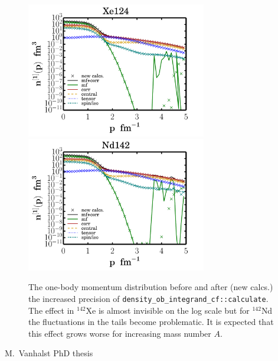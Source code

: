 \documentclass[10pt]{article}
\begin{document}
\begin{figure}
\centering
\includegraphics[width=0.7\textwidth]{figures/ob_Xe124_comparison.pdf}
\includegraphics[width=0.7\textwidth]{figures/ob_Nd142_comparison.pdf}
\caption{The one-body momentum distribution before and after (new calcs.) the increased precision of \texttt{density\_ob\_integrand\_cf::calculate}.
The effect in $^{142}$Xe is almost invisible on the log scale but for $^{142}$Nd the fluctuations in
the tails become problematic. It is expected that this effect grows worse for increasing mass number $A$.}
\label{fig:ob_bad_tails}
\end{figure}

\begin{thebibliography}{10}

M.~Vanhalst
\newblock PhD thesis

\end{thebibliography}
\end{document}
